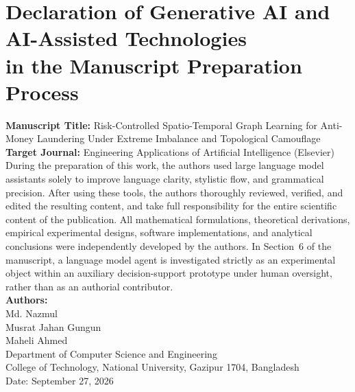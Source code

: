 \documentclass[a4paper,11pt]{article}
\begin{document}
\section*{Declaration of Generative AI and AI-Assisted Technologies\\ in the Manuscript Preparation Process}

\noindent\textbf{Manuscript Title:} Risk-Controlled Spatio-Temporal Graph Learning for Anti-Money Laundering Under Extreme Imbalance and Topological Camouflage\\[1.5ex]
\textbf{Target Journal:} Engineering Applications of Artificial Intelligence (Elsevier)\\[2.0ex]

\noindent During the preparation of this work, the authors used large language model assistants solely to improve language clarity, stylistic flow, and grammatical precision. After using these tools, the authors thoroughly reviewed, verified, and edited the resulting content, and take full responsibility for the entire scientific content of the publication. All mathematical formulations, theoretical derivations, empirical experimental designs, software implementations, and analytical conclusions were independently developed by the authors. In Section~6 of the manuscript, a language model agent is investigated strictly as an experimental object within an auxiliary decision-support prototype under human oversight, rather than as an authorial contributor.\\[3.0ex]

\noindent\textbf{Authors:}\\
Md. Nazmul\\
Musrat Jahan Gungun\\
Maheli Ahmed\\[2.0ex]
Department of Computer Science and Engineering\\
College of Technology, National University, Gazipur 1704, Bangladesh\\[2.0ex]
Date: September 27, 2026
\end{document}

